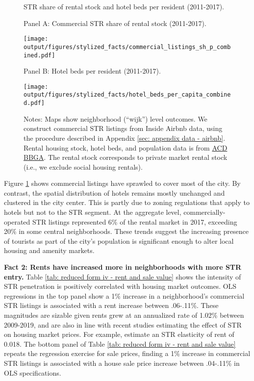 \documentclass[11pt]{article}
\newcommand{\Paragraph}{\vspace{0.1cm}\noindent\textbf}
\begin{document}
\vspace{-0.25cm}

\begin{figure}[H]
    \caption{STR share of rental stock and hotel beds per resident (2011-2017).}\label{fig:spatial evolution airbnb}
    \centering
    \caption*{Panel A: Commercial STR share of rental stock (2011-2017).}
    \texttt{[image: output/figures/stylized\_facts/commercial\_listings\_sh\_p\_combined.pdf]}
    \caption*{Panel B: Hotel beds per resident (2011-2017).}
    \texttt{[image: output/figures/stylized\_facts/hotel\_beds\_per\_capita\_combined.pdf]} 
    \caption*{\footnotesize Notes: Maps show neighborhood (``wijk'') level outcomes. We construct commercial STR listings from Inside Airbnb data, using the procedure described in Appendix \ref{sec: appendix data - airbnb}. Rental housing stock, hotel beds, and population data is from \href{https://data.amsterdam.nl/datasets/rl6-35tFAw2Ljw/basisbestand-gebieden-amsterdam-bbga/}{ACD BBGA}. The rental stock corresponds to private market rental stock (i.e., we exclude social housing rentals).}
\end{figure}

Figure \ref{fig:spatial evolution airbnb} shows commercial listings have sprawled to cover most of the city. By contrast, the spatial distribution of hotels remains mostly unchanged and clustered in the city center. This is partly due to zoning regulations that apply to hotels but not to the STR segment. At the aggregate level, commercially-operated STR listings represented 6\% of the rental market in 2017, exceeding 20\% in some central neighborhoods. These trends suggest the increasing presence of tourists as part of the city's population is significant enough to alter local housing and amenity markets.


\Paragraph{Fact 2: Rents have increased more in neighborhoods with more STR entry.} Table \ref{tab: reduced form iv - rent and sale value} shows the intensity of STR penetration is positively correlated with housing market outcomes. OLS regressions in the top panel show a 1\% increase in a neighborhood's commercial STR listings is associated with a rent increase between .06-.11\%. These magnitudes are sizable given rents grew at an annualized rate of 1.02\% between 2009-2019, and are also in line with recent studies estimating the effect of STR on housing market prices. For example, \cite{barron2021effect} estimate an STR elasticity of rent of 0.018. The bottom panel of Table \ref{tab: reduced form iv - rent and sale value} repeats the regression exercise for sale prices, finding a 1\% increase in commercial STR listings is associated with a house sale price increase between .04-.11\% in OLS specifications.
\end{document}
